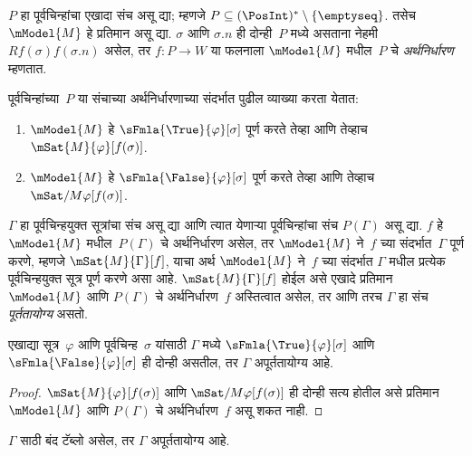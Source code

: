 \begin{defn}
  $P$ हा पूर्वचिन्हांचा एखादा संच असू द्या; म्हणजे
  $P \subseteq (\PosInt)^* \setminus
  \{\emptyseq\}$. तसेच $\mModel{M}$ हे प्रतिमान असू द्या.
  $\sigma$ आणि $\sigma.n$ ही दोन्ही~$P$ मध्ये असताना
  नेहमी $Rf(\sigma)f(\sigma.n)$ असेल, तर
  $f\colon P \to W$ या फलनाला $\mModel{M}$
  मधील~$P$ चे \emph{अर्थनिर्धारण} म्हणतात.

  पूर्वचिन्हांच्या~$P$ या संचाच्या अर्थनिर्धारणाच्या
  संदर्भात पुढील व्याख्या करता येतात:
  \begin{enumerate}
  \item $\mModel{M}$ हे $\sFmla{\True}{\varphi}[\sigma]$
    पूर्ण करते तेव्हा आणि तेव्हाच
    $\mSat{M}{\varphi}[f(\sigma)]$.
  \item $\mModel{M}$ हे $\sFmla{\False}{\varphi}[\sigma]$
    पूर्ण करते तेव्हा आणि तेव्हाच
    $\mSat/{M}{\varphi}[f(\sigma)]$.
  \end{enumerate}
\end{defn}

\begin{defn}
  $\Gamma$ हा पूर्वचिन्हयुक्त सूत्रांचा
  संच असू द्या आणि त्यात येणाऱ्या पूर्वचिन्हांचा
  संच $P(\Gamma)$ असू द्या. $f$ हे $\mModel{M}$
  मधील~$P(\Gamma)$ चे अर्थनिर्धारण असेल, तर
  $\mModel{M}$ ने~$f$ च्या संदर्भात~$\Gamma$
  पूर्ण करणे, म्हणजे $\mSat{M}{\Gamma}[f]$,
  याचा अर्थ $\mModel{M}$ ने~$f$ च्या संदर्भात
  $\Gamma$ मधील प्रत्येक पूर्वचिन्हयुक्त सूत्र
  पूर्ण करणे असा आहे. $\mSat{M}{\Gamma}[f]$
  होईल असे एखादे प्रतिमान~$\mModel{M}$ आणि
  $P(\Gamma)$ चे अर्थनिर्धारण~$f$ अस्तित्वात असेल,
  तर आणि तरच $\Gamma$ हा संच \emph{पूर्ततायोग्य} असतो.
\end{defn}

\begin{prop}
  एखाद्या सूत्र~$\varphi$ आणि पूर्वचिन्ह~$\sigma$
  यांसाठी $\Gamma$ मध्ये
  $\sFmla{\True}{\varphi}[\sigma]$ आणि
  $\sFmla{\False}{\varphi}[\sigma]$ ही दोन्ही असतील,
  तर $\Gamma$ अपूर्ततायोग्य आहे.
\end{prop}

\begin{proof}
  $\mSat{M}{\varphi}[f(\sigma)]$ आणि
  $\mSat/{M}{\varphi}[f(\sigma)]$ ही दोन्ही सत्य होतील
  असे प्रतिमान~$\mModel{M}$ आणि $P(\Gamma)$ चे
  अर्थनिर्धारण~$f$ असू शकत नाही.
\end{proof}

\begin{thm}[निर्दोषता]
  \label{nml:tab:sou:thm:tableau-soundness}
  $\Gamma$ साठी बंद टॅब्लो असेल, तर
  $\Gamma$ अपूर्ततायोग्य आहे.
\end{thm}

